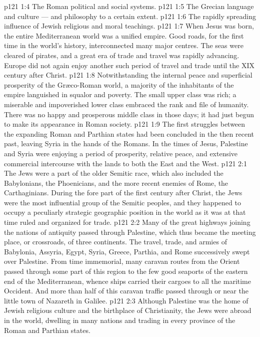 \vs p121 1:4 \bibnobreakspace The Roman political and social systems.
\vs p121 1:5 \bibnobreakspace The Grecian language and culture --- and philosophy to a certain extent.
\vs p121 1:6 \bibnobreakspace The rapidly spreading influence of Jewish religious and moral teachings.
\vs p121 1:7 \pc When Jesus was born, the entire Mediterranean world was a unified empire. Good roads, for the first time in the world’s history, interconnected many major centres. The seas were cleared of pirates, and a great era of trade and travel was rapidly advancing. Europe did not again enjoy another such period of travel and trade until the XIX century after Christ.
\vs p121 1:8 Notwithstanding the internal peace and superficial prosperity of the Gr\ae co\hyp{}Roman world, a majority of the inhabitants of the empire languished in squalor and poverty. The small upper class was rich; a miserable and impoverished lower class embraced the rank and file of humanity. There was no happy and prosperous middle class in those days; it had just begun to make its appearance in Roman society.
\vs p121 1:9 The first struggles between the expanding Roman and Parthian states had been concluded in the then recent past, leaving Syria in the hands of the Romans. In the times of Jesus, Palestine and Syria were enjoying a period of prosperity, relative peace, and extensive commercial intercourse with the lands to both the East and the West.
\vs p121 2:1 The Jews were a part of the older Semitic race, which also included the Babylonians, the Phoenicians, and the more recent enemies of Rome, the Carthaginians. During the fore part of the first century after Christ, the Jews were the most influential group of the Semitic peoples, and they happened to occupy a peculiarly strategic geographic position in the world as it was at that time ruled and organized for trade.
\vs p121 2:2 Many of the great highways joining the nations of antiquity passed through Palestine, which thus became the meeting place, or crossroads, of three continents. The travel, trade, and armies of Babylonia, Assyria, Egypt, Syria, Greece, Parthia, and Rome successively swept over Palestine. From time immemorial, many caravan routes from the Orient passed through some part of this region to the few good seaports of the eastern end of the Mediterranean, whence ships carried their cargoes to all the maritime Occident. And more than half of this caravan traffic passed through or near the little town of Nazareth in Galilee.
\vs p121 2:3 Although Palestine was the home of Jewish religious culture and the birthplace of Christianity, the Jews were abroad in the world, dwelling in many nations and trading in every province of the Roman and Parthian states.
